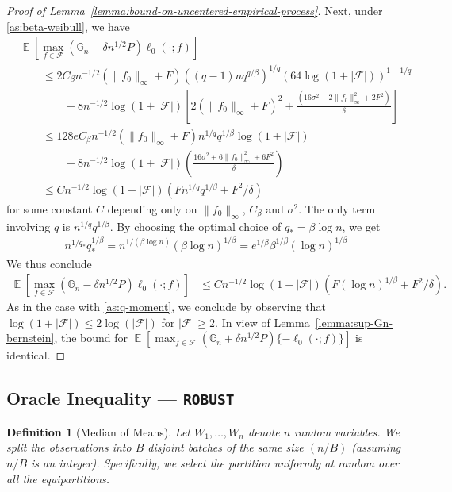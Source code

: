 \documentclass[12pt]{article}
\DeclareMathOperator*{\E}{\mathbb{E}}
\newtheorem{definition}[theorem]{Definition}
\begin{document}
\begin{appendices}
\begin{proof}[Proof of Lemma~\ref{lemma:bound-on-uncentered-empirical-process}]
Next, under \ref{as:beta-weibull}, we have 
\begin{align*}
	&\E\left[\max_{f \in \mathcal{F}}\left(\mathbb{G}_n -\delta n^{1/2}P\right)\ell_0(\cdot; f)\right] \nonumber\\
 &\qquad \le 2C_\beta n^{-1/2}(\|f_0\|_\infty + F)\left((q-1)nq^{q/\beta}\right)^{1/q}\left(64\log (1+|\mathcal{F}|)\right)^{1-1/q}\nonumber \\
    &\qquad \qquad + 8n^{-1/2}\log (1+|\mathcal{F}|)\left[2(\|f_0\|_\infty + F)^2+\frac{(16\sigma^2+2\|f_0\|_\infty^2 + 2F^2)}{\delta}\right]\\
    &\qquad \le 128 eC_\beta n^{-1/2}(\|f_0\|_\infty + F)n^{1/q}q^{1/\beta}\log (1+|\mathcal{F}|)\nonumber \\
    &\qquad \qquad + 8n^{-1/2}\log (1+|\mathcal{F}|)\left(\frac{16\sigma^2+6\|f_0\|_\infty^2 + 6F^2}{\delta}\right)\\
    &\qquad \le Cn^{-1/2}\log (1+|\mathcal{F}|) \left(Fn^{1/q}q^{1/\beta} + F^2/\delta\right)\nonumber 
\end{align*}
for some constant $C$ depending only on $\|f_0\|_\infty$, $C_\beta$ and $\sigma^2$. The only term involving $q$ is $n^{1/q}q^{1/\beta}$. By choosing the optimal choice of $q_*=\beta \log n$, we get
\begin{align}
	n^{1/q_*}q_*^{1/\beta} = n^{1/(\beta \log n)}(\beta \log n)^{1/\beta} = e^{1/\beta} \beta^{1/\beta} (\log n)^{1/\beta} \nonumber
\end{align} 
We thus conclude 
\begin{align}
	\E\left[\max_{f \in \mathcal{F}}\left(\mathbb{G}_n -\delta n^{1/2}P\right)\ell_0(\cdot; f)\right]&\le Cn^{-1/2}\log (1+|\mathcal{F}|) \left(F(\log n)^{1/\beta} + F^2/\delta\right). \nonumber \end{align}
As in the case with \ref{as:q-moment}, we conclude by observing that $\log (1+|\mathcal{F}|) \le 2\log (|\mathcal{F}|)$ for $|\mathcal{F}| \ge 2$. In view of Lemma~\ref{lemma:sup-Gn-bernstein}, the bound for $\E\left[\max_{f \in \mathcal{F}}\left(\mathbb{G}_n +\delta n^{1/2}P\right)\{-\ell_0(\cdot; f)\}\right]$ is identical.
\end{proof}
\subsection{Oracle Inequality --- \texttt{ROBUST}}\label{supp:oracle-robust}
\begin{definition}[Median of Means]\label{def:mom}
    Let $W_1, \ldots, W_n$ denote $n$ random variables. We split the observations into $B$ disjoint batches of the same size $(n/B)$ (assuming $n/B$ is an integer). Specifically, we select the partition uniformly at random over all the equipartitions. 
    

\end{definition}
\end{appendices}
\end{document}
